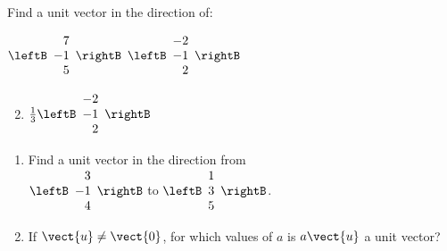 \begin{multicols}{2}
\begin{ex}
\begin{sol}
\begin{enumerate}[label={\alph*.}]
\end{enumerate}
\end{sol}
\end{ex}


\begin{ex}
Find a unit vector in the direction of:

\begin{exenumerate}[column-sep=-5em]
\exitem $\leftB
\begin{array}{r}
7 \\
-1 \\
5
\end{array}
\rightB$
\exitem $\leftB
\begin{array}{r}
-2 \\
-1 \\
2
\end{array}
\rightB$
\end{exenumerate}
\begin{sol}
\begin{enumerate}[label={\alph*.}]
\setcounter{enumi}{1}
\item 
$\frac{1}{3}\leftB
\begin{array}{r}
-2 \\
-1 \\
2
\end{array}
\rightB$

\end{enumerate}
\end{sol}
\end{ex}

\begin{ex}
\begin{enumerate}[label={\alph*.}]
\item Find a unit vector in the direction from \\
$\leftB
\begin{array}{r}
3 \\
-1 \\
4
\end{array}
\rightB$
to
$\leftB
\begin{array}{r}
1\\
3 \\
5
\end{array}
\rightB$.

\item If $\vect{u} \neq \vect{0}$, for which values of $a$ is $a\vect{u}$ a unit vector?

\end{enumerate}
\end{ex}


\end{multicols}
